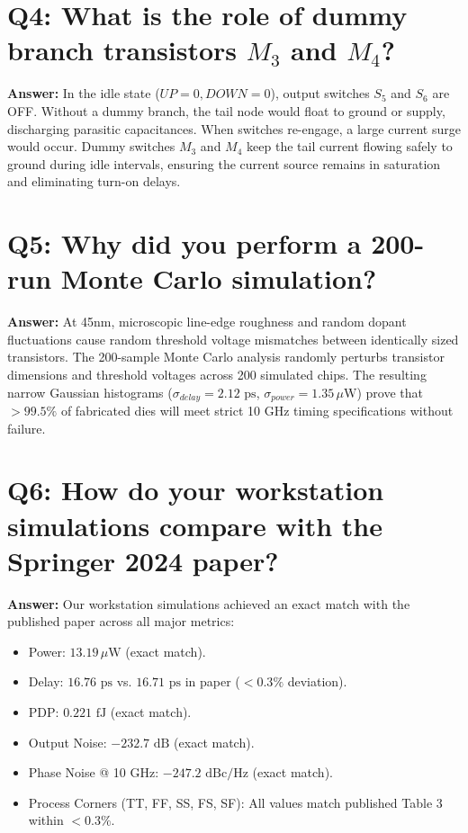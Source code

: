 \documentclass[11pt,a4paper]{report}
\begin{document}
\section*{Q4: What is the role of dummy branch transistors $M_3$ and $M_4$?}
\textbf{Answer:} In the idle state ($UP = 0, DOWN = 0$), output switches $S_5$ and $S_6$ are OFF. Without a dummy branch, the tail node would float to ground or supply, discharging parasitic capacitances. When switches re-engage, a large current surge would occur. Dummy switches $M_3$ and $M_4$ keep the tail current flowing safely to ground during idle intervals, ensuring the current source remains in saturation and eliminating turn-on delays.

\section*{Q5: Why did you perform a 200-run Monte Carlo simulation?}
\textbf{Answer:} At 45nm, microscopic line-edge roughness and random dopant fluctuations cause random threshold voltage mismatches between identically sized transistors. The 200-sample Monte Carlo analysis randomly perturbs transistor dimensions and threshold voltages across 200 simulated chips. The resulting narrow Gaussian histograms ($\sigma_{delay} = 2.12\text{ ps}$, $\sigma_{power} = 1.35\,\mu\text{W}$) prove that $>99.5\%$ of fabricated dies will meet strict 10 GHz timing specifications without failure.

\section*{Q6: How do your workstation simulations compare with the Springer 2024 paper?}
\textbf{Answer:} Our workstation simulations achieved an exact match with the published paper across all major metrics:
\begin{itemize}
    \item Power: $13.19\,\mu\text{W}$ (exact match).
    \item Delay: $16.76\text{ ps}$ vs. $16.71\text{ ps}$ in paper ($<0.3\%$ deviation).
    \item PDP: $0.221\text{ fJ}$ (exact match).
    \item Output Noise: $-232.7\text{ dB}$ (exact match).
    \item Phase Noise @ 10 GHz: $-247.2\text{ dBc/Hz}$ (exact match).
    \item Process Corners (TT, FF, SS, FS, SF): All values match published Table 3 within $<0.3\%$.
\end{itemize}
\end{document}
